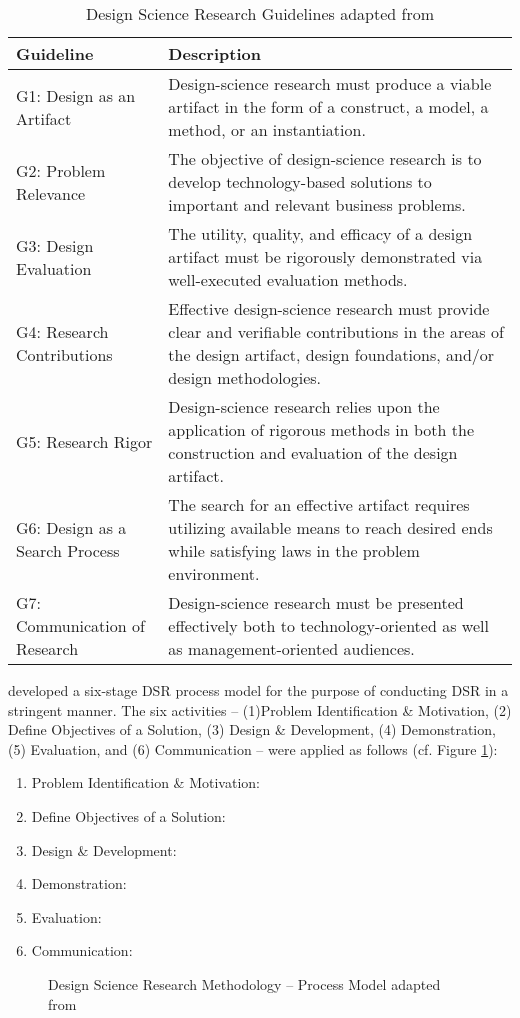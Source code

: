 \begin{table}[t]
	\centering
	\begin{tabular}{L{.2\textwidth}L{.7\textwidth}}
			\toprule 
			Guideline & Description \\ \midrule
			G1: Design as an Artifact & 
			Design-science research must produce a viable artifact in the form of a construct, a model, a method, or an instantiation.\\ \midrule
			G2: Problem Relevance&
			The objective of design-science research is to develop technology-based solutions to important and relevant business problems.\\ \midrule
			G3: Design Evaluation&
			The utility, quality, and efficacy of a design artifact must be rigorously demonstrated via well-executed evaluation methods.\\ \midrule
			G4: Research Contributions&
			Effective design-science research must provide clear and verifiable contributions in the areas of the design artifact, design foundations, and/or design methodologies.\\ \midrule
			G5: Research Rigor&
			Design-science research relies upon the application of rigorous methods in both the construction and evaluation of the design artifact.\\ \midrule
			G6: Design as a Search Process&
			The search for an effective artifact requires utilizing available means to reach desired ends while satisfying laws in the problem environment.\\ \midrule
			G7: Communication of Research&
			Design-science research must be presented effectively both to technology-oriented as well as management-oriented audiences.\\ \bottomrule
	\end{tabular}
	\caption[Design Science Research Guidelines]{Design Science Research Guidelines adapted from \citet[p. 83]{Hevner2007}}
	\label{tab:dsrg}
\end{table}

\citet[pp. 52-56]{Peffers2007} developed a six-stage \ac{DSR} process model for the purpose of conducting \ac{DSR} in a stringent manner. The six activities -- (1)Problem Identification \& Motivation, (2) Define Objectives of a Solution, (3) Design \& Development, (4) Demonstration, (5) Evaluation, and (6) Communication -- were applied as follows (cf. Figure \ref{fig:dsrm}):

\begin{enumerate}
	\item Problem Identification \& Motivation:
	\item Define Objectives of a Solution:
	\item Design \& Development:
	\item Demonstration:
	\item Evaluation:
	\item Communication:
\end{enumerate}



\begin{figure}[tb]
	\centering
	
	\caption[Design Science Research Methodology -- Process Model]{Design Science Research Methodology -- Process Model adapted from \citet[p. 54]{Peffers2007}}
	\label{fig:dsrm}
\end{figure}

